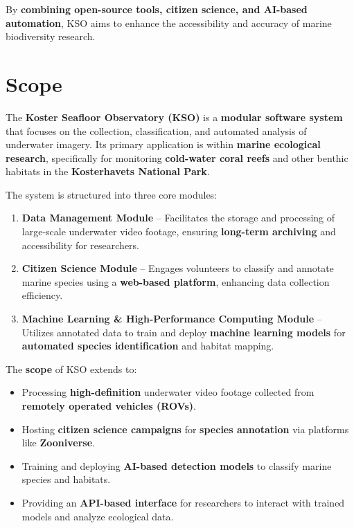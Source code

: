 By \textbf{combining open-source tools, citizen science, and AI-based automation}, KSO aims to enhance the accessibility and accuracy of marine biodiversity research.


\section{Scope}

The \textbf{Koster Seafloor Observatory (KSO)} is a \textbf{modular software system} that focuses on the collection, classification, and automated analysis of underwater imagery. Its primary application is within \textbf{marine ecological research}, specifically for monitoring \textbf{cold-water coral reefs} and other benthic habitats in the \textbf{Kosterhavets National Park}.

The system is structured into three core modules:
\begin{enumerate}
    \item \textbf{Data Management Module} – Facilitates the storage and processing of large-scale underwater video footage, ensuring \textbf{long-term archiving} and accessibility for researchers.
    \item \textbf{Citizen Science Module} – Engages volunteers to classify and annotate marine species using a \textbf{web-based platform}, enhancing data collection efficiency.
    \item \textbf{Machine Learning \& High-Performance Computing Module} – Utilizes annotated data to train and deploy \textbf{machine learning models} for \textbf{automated species identification} and habitat mapping.
\end{enumerate}

The \textbf{scope} of KSO extends to:
\begin{itemize}
    \item Processing \textbf{high-definition} underwater video footage collected from \textbf{remotely operated vehicles (ROVs)}.
    \item Hosting \textbf{citizen science campaigns} for \textbf{species annotation} via platforms like \textbf{Zooniverse}.
    \item Training and deploying \textbf{AI-based detection models} to classify marine species and habitats.
    \item Providing an \textbf{API-based interface} for researchers to interact with trained models and analyze ecological data.
\end{itemize}

